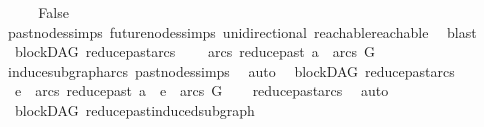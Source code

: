\begin{isabellebody}
\ \ \isamarkupfalse%
\ \isamarkupfalse%
\ False\isanewline
\ \ \ \ \isamarkupfalse%
\ past{\isacharunderscore}{\kern0pt}nodes{\isachardot}{\kern0pt}simps\ future{\isacharunderscore}{\kern0pt}nodes{\isachardot}{\kern0pt}simps\ unidirectional\ reachable{}{\isacharunderscore}{\kern0pt}reachable\ \isamarkupfalse%
\ blast\isanewline
{}\isamarkupfalse%
%
\endisatagproof
{\isafoldproof}%
%
\isadelimproof
%
\endisadelimproof
%
\isadelimdocument
%
\endisadelimdocument
%
\isatagdocument
%
\isamarkuptrue%
%
\endisatagdocument
{\isafolddocument}%
%
\isadelimdocument
%
\endisadelimdocument
{}\isamarkupfalse%
\ {\isacharparenleft}{\kern0pt}\ blockDAG{\isacharparenright}{\kern0pt}\ reduce{\isacharunderscore}{\kern0pt}past{\isacharunderscore}{\kern0pt}arcs{\isacharcolon}{\kern0pt}\ \isanewline
\ \ \ {\isachardoublequoteopen}arcs\ {\isacharparenleft}{\kern0pt}reduce{\isacharunderscore}{\kern0pt}past\ a{\isacharparenright}{\kern0pt}\ {\isasymsubseteq}\ arcs\ G{\isachardoublequoteclose}\isanewline
%
\isadelimproof
\ \ %
\endisadelimproof
%
\isatagproof
{}\isamarkupfalse%
\ induce{\isacharunderscore}{\kern0pt}subgraph{\isacharunderscore}{\kern0pt}arcs\ past{\isacharunderscore}{\kern0pt}nodes{\isachardot}{\kern0pt}simps\ \isamarkupfalse%
\ auto%
\endisatagproof
{\isafoldproof}%
%
\isadelimproof
\isanewline
%
\endisadelimproof
\isanewline
{}\isamarkupfalse%
\ {\isacharparenleft}{\kern0pt}\ blockDAG{\isacharparenright}{\kern0pt}\ reduce{\isacharunderscore}{\kern0pt}past{\isacharunderscore}{\kern0pt}arcs{}{\isacharcolon}{\kern0pt}\isanewline
\ \ {\isachardoublequoteopen}e\ {\isasymin}\ arcs\ {\isacharparenleft}{\kern0pt}reduce{\isacharunderscore}{\kern0pt}past\ a{\isacharparenright}{\kern0pt}\ {\isasymLongrightarrow}\ e\ {\isasymin}\ arcs\ G{\isachardoublequoteclose}\isanewline
%
\isadelimproof
\ \ %
\endisadelimproof
%
\isatagproof
{}\isamarkupfalse%
\ reduce{\isacharunderscore}{\kern0pt}past{\isacharunderscore}{\kern0pt}arcs\ \isamarkupfalse%
\ auto%
\endisatagproof
{\isafoldproof}%
%
\isadelimproof
\isanewline
%
\endisadelimproof
\isanewline
{}\isamarkupfalse%
\ {\isacharparenleft}{\kern0pt}\ blockDAG{\isacharparenright}{\kern0pt}\ reduce{\isacharunderscore}{\kern0pt}past{\isacharunderscore}{\kern0pt}induced{\isacharunderscore}{\kern0pt}subgraph{\isacharcolon}{\kern0pt}\isanewline

\end{isabellebody}
